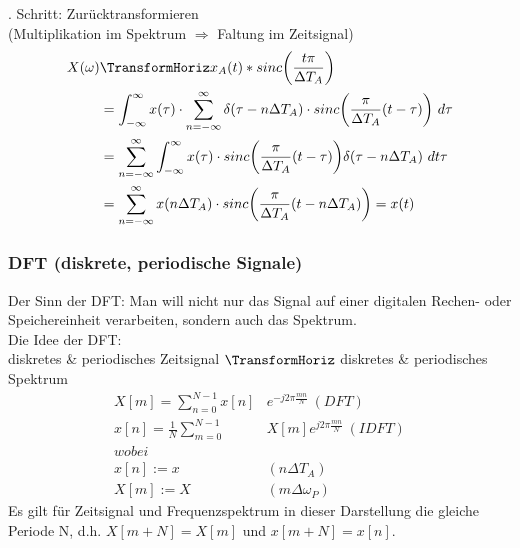 \documentclass[12pt,a4paper]{scrartcl}
\begin{document}
  . Schritt: Zurücktransformieren\\
  (Multiplikation im Spektrum $\Rightarrow$ Faltung im Zeitsignal)
  \begin{equation}
    \label{eq:17}
    \begin{split}
      X(\omega) &\TransformHoriz x_A(t) * sinc\bigg(\frac{t\pi}{\Delta T_A}\bigg) \\
        &= \int_{-\infty}^{\infty}x(\tau) \cdot \sum_{n=-\infty}^{\infty} \delta(\tau - n\Delta T_A) \cdot sinc\bigg(\frac{\pi}{\Delta T_A}(t-\tau)\bigg)\ d\tau \\
         &= \sum_{n=-\infty}^{\infty} \int_{-\infty}^{\infty}x(\tau) \cdot sinc\bigg(\frac{\pi}{\Delta T_A}(t-\tau)\bigg) \delta(\tau - n\Delta T_A)\ dt \tau \\
         &= \sum_{n=-\infty}^{\infty} x(n \Delta T_A) \cdot sinc\bigg(\frac{\pi}{\Delta T_A}(t-n\Delta T_A)\bigg) = x(t) 
        \end{split}
  \end{equation} 


  \subsubsection{DFT (diskrete, periodische Signale)}
  \label{sec.sub:sub:dft}

\noindent Der Sinn der DFT: Man will nicht nur das Signal auf einer digitalen Rechen- oder Speichereinheit verarbeiten, sondern auch das Spektrum. \\
  Die Idee der DFT: \\
    diskretes \& periodisches Zeitsignal $\TransformHoriz$ diskretes \& periodisches Spektrum \\
\begin{equation}
  \label{eq:18}
  \begin{split}
    X[m] = \sum_{n = 0}^{N-1} x[n]& e^{-j2\pi \frac{mn}{N}}\ (DFT) \\
    x[n] = \frac{1}{N}\sum_{m = 0}^{N-1} &X[m] e^{j2\pi \frac{mn}{N}}\ (IDFT) \\
    wobei& \\
    x[n] := x&(n\Delta T_A) \\
    X[m] := X&(m\Delta \omega_P)
  \end{split}
\end{equation}
\noindent Es gilt für Zeitsignal und Frequenzspektrum in dieser Darstellung die gleiche Periode N, d.h. $X[m+N] = X[m]$ und $x[m +N] = x[n]$. \\
\end{document}
